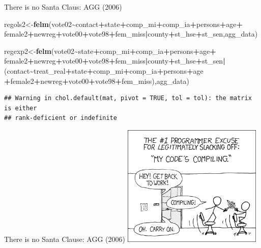\documentclass[
  ignorenonframetext,
]{beamer}
\newenvironment{Shaded}{\begin{snugshade}}{\end{snugshade}}
\newcommand{\KeywordTok}[1]{\textcolor[rgb]{0.13,0.29,0.53}{\textbf{#1}}}
\newcommand{\NormalTok}[1]{#1}
\newcommand{\OperatorTok}[1]{\textcolor[rgb]{0.81,0.36,0.00}{\textbf{#1}}}
\newcommand{\StringTok}[1]{\textcolor[rgb]{0.31,0.60,0.02}{#1}}
\begin{document}
\begin{frame}[fragile]{There is no Santa Claus: AGG (2006)}
\protect\hypertarget{there-is-no-santa-claus-agg-2006-5}{}
\tiny

\begin{Shaded}
\begin{Highlighting}[]
\NormalTok{regols2\textless{}{-}}\KeywordTok{felm}\NormalTok{(vote02}\OperatorTok{\textasciitilde{}}\NormalTok{contact}\OperatorTok{+}\NormalTok{state}\OperatorTok{+}\NormalTok{comp\_mi}\OperatorTok{+}\NormalTok{comp\_ia}\OperatorTok{+}\NormalTok{persons}\OperatorTok{+}\NormalTok{age}\OperatorTok{+}
\StringTok{                }\NormalTok{female2}\OperatorTok{+}\NormalTok{newreg}\OperatorTok{+}\NormalTok{vote00}\OperatorTok{+}\NormalTok{vote98}\OperatorTok{+}\NormalTok{fem\_miss}\OperatorTok{|}\NormalTok{county}\OperatorTok{+}\NormalTok{st\_hse}\OperatorTok{+}\NormalTok{st\_sen,agg\_data)}

\NormalTok{regexp2\textless{}{-}}\KeywordTok{felm}\NormalTok{(vote02}\OperatorTok{\textasciitilde{}}\NormalTok{state}\OperatorTok{+}\NormalTok{comp\_mi}\OperatorTok{+}\NormalTok{comp\_ia}\OperatorTok{+}\NormalTok{persons}\OperatorTok{+}\NormalTok{age}\OperatorTok{+}
\StringTok{                }\NormalTok{female2}\OperatorTok{+}\NormalTok{newreg}\OperatorTok{+}\NormalTok{vote00}\OperatorTok{+}\NormalTok{vote98}\OperatorTok{+}\NormalTok{fem\_miss}\OperatorTok{|}\NormalTok{county}\OperatorTok{+}\NormalTok{st\_hse}\OperatorTok{+}\NormalTok{st\_sen}\OperatorTok{|}
\NormalTok{(contact}\OperatorTok{\textasciitilde{}}\NormalTok{treat\_real}\OperatorTok{+}\NormalTok{state}\OperatorTok{+}\NormalTok{comp\_mi}\OperatorTok{+}\NormalTok{comp\_ia}\OperatorTok{+}\NormalTok{persons}\OperatorTok{+}\NormalTok{age}
 \OperatorTok{+}\NormalTok{female2}\OperatorTok{+}\NormalTok{newreg}\OperatorTok{+}\NormalTok{vote00}\OperatorTok{+}\NormalTok{vote98}\OperatorTok{+}\NormalTok{fem\_miss),agg\_data)}
\end{Highlighting}
\end{Shaded}

\begin{verbatim}
## Warning in chol.default(mat, pivot = TRUE, tol = tol): the matrix is either
## rank-deficient or indefinite
\end{verbatim}
\end{frame}

\begin{frame}{There is no Santa Clause: AGG (2006)}
\protect\hypertarget{there-is-no-santa-clause-agg-2006}{}
\center \includegraphics[width=0.5\textwidth,height=\textheight]{"images/codecomic2.png"}
\end{frame}
\end{document}
